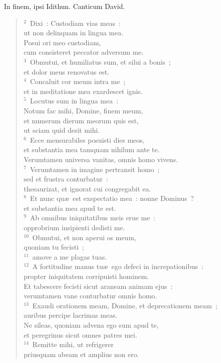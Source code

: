 \lettrine[lines=3,image=true,loversize=0.05,lraise=-0.03]{I}{}n finem, ipsi Idithun. Canticum David.
\begin{flushleft}\begin{verse}\vspace{6pt}${}^{2}$~Dixi~: Custodiam vias meas~:\\ ut non delinquam in lingua mea.\\ Posui ori meo custodiam,\\ cum consisteret peccator adversum me.\\
${}^{3}$~Obmutui, et humiliatus sum, et silui a bonis~;\\ et dolor meus renovatus est.\\
${}^{4}$~Concaluit cor meum intra me~;\\ et in meditatione mea exardescet ignis.\\
${}^{5}$~Locutus sum in lingua mea~:\\ Notum fac mihi, Domine, finem meum,\\ et numerum dierum meorum quis est,\\ ut sciam quid desit mihi.\\
${}^{6}$~Ecce mensurabiles posuisti dies meos,\\ et substantia mea tamquam nihilum ante te.\\ Verumtamen universa vanitas, omnis homo vivens.\\
${}^{7}$~Verumtamen in imagine pertransit homo~;\\ sed et frustra conturbatur~:\\ thesaurizat, et ignorat cui congregabit ea.\\
${}^{8}$~Et nunc qu\ae\ est exspectatio mea~: nonne Dominus~?\\ et substantia mea apud te est.\\
${}^{9}$~Ab omnibus iniquitatibus meis erue me~:\\ opprobrium insipienti dedisti me.\\
${}^{10}$~Obmutui, et non aperui os meum,\\ quoniam tu fecisti~;\\
${}^{11}$~amove a me plagas tuas.\\
${}^{12}$~A fortitudine manus tu\ae\ ego defeci in increpationibus~:\\ propter iniquitatem corripuisti hominem.\\ Et tabescere fecisti sicut araneam animam ejus~:\\ verumtamen vane conturbatur omnis homo.\\
${}^{13}$~Exaudi orationem meam, Domine, et deprecationem meam~;\\ auribus percipe lacrimas meas.\\ Ne sileas, quoniam advena ego sum apud te,\\ et peregrinus sicut omnes patres mei.\\
${}^{14}$~Remitte mihi, ut refrigerer\\ priusquam abeam et amplius non ero.\end{verse}\end{flushleft}



